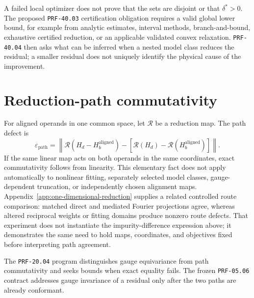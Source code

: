 A failed local optimizer does not prove that the sets are disjoint or that
$\delta^{\ast}>0$. The proposed \texttt{PRF-40.03} certification obligation
requires a valid global lower bound, for example from analytic estimates,
interval methods, branch-and-bound, exhaustive certified reduction, or an
applicable validated convex relaxation. \texttt{PRF-40.04} then asks what can be
inferred when a nested model class reduces the residual; a smaller residual does
not uniquely identify the physical cause of the improvement.


\section{Reduction-path commutativity}


For aligned operands in one common space, let $\mathcal R$ be a reduction map.
The path defect is
\begin{equation}
  \varepsilon_{\mathrm{path}}
  =
  \left\|
    \mathcal R(H_d-H_b^{\mathrm{aligned}})
    -
    [\mathcal R(H_d)-\mathcal R(H_b^{\mathrm{aligned}})]
  \right\|.
\end{equation}
If the same linear map acts on both operands in the same coordinates, exact
commutativity follows from linearity. This elementary fact does not apply
automatically to nonlinear fitting, separately selected model classes,
gauge-dependent truncation, or independently chosen alignment maps.
Appendix~\ref{app:one-dimensional-reduction} supplies a related controlled route
comparison: matched direct and mediated Fourier projections agree, whereas
altered reciprocal weights or fitting domains produce nonzero route defects.
That experiment does not instantiate the impurity-difference expression above;
it demonstrates the same need to hold maps, coordinates, and objectives fixed
before interpreting path agreement.

The \texttt{PRF-20.04} program distinguishes gauge equivariance from path
commutativity and seeks bounds when exact equality fails. The frozen
\texttt{PRF-05.06} contract addresses gauge invariance of a residual only after
the two paths are already conformant.

